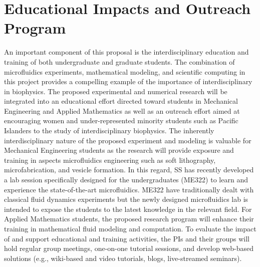 \documentclass[11pt]{article}
\begin{document}
\vspace*{-7pt}
\section{Educational Impacts and Outreach Program}
\label{sec:Educational_plans}
\vspace*{-7pt}


An important component of this proposal is the interdisciplinary
education and training of both undergraduate and graduate students. The
combination of microfluidics experiments, mathematical modeling, and
scientific computing in this project provides a compelling example of
the importance of interdisciplinary in biophysics. The proposed
experimental and numerical research will be integrated into an
educational effort directed toward students in Mechanical Engineering
and Applied Mathematics as well as an outreach effort aimed at
encouraging women and under-represented minority students such as
Pacific Islanders to the study of interdisciplinary biophysics. The
inherently interdisciplinary nature of the proposed experiment and
modeling is valuable for Mechanical Engineering students as the research
will provide exposure and training in aspects microfluidics engineering
such as soft lithography, microfabrication, and vesicle formation. In
this regard, SS has recently developed a lab session specifically
designed for the undergraduates (ME322) to learn and experience the
state-of-the-art microfluidics. ME322 have traditionally dealt with
classical fluid dynamics experiments but the newly designed
microfluidics lab is intended to expose the students to the latest
knowledge in the relevant field.  For Applied Mathematics students, the
proposed research program will enhance their training in mathematical
fluid modeling and computation. To evaluate the impact of and support
educational and training activities, the PIs and their groups will hold
regular group meetings, one-on-one tutorial sessions, and develop
web-based solutions (e.g., wiki-based and video tutorials, blogs,
live-streamed seminars).
\end{document}
